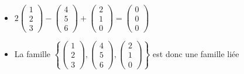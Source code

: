\begin{frame}
\begin{exemple}
\begin{itemize}
\pause
\item $2\left(\begin{smallmatrix}
1\\2\\3
\end{smallmatrix}\right)
-\left(\begin{smallmatrix}
4\\5\\6
\end{smallmatrix}\right) 
+\left(\begin{smallmatrix}
2\\1\\0
\end{smallmatrix}\right) = 
\left(\begin{smallmatrix}
0\\0\\0
\end{smallmatrix}\right)$
\pause
\item La famille 
$\left\{\left(\begin{smallmatrix}
1\\2\\3
\end{smallmatrix}\right),
\left(\begin{smallmatrix}
4\\5\\6
\end{smallmatrix}\right),
\left(\begin{smallmatrix}
2\\1\\0
\end{smallmatrix}\right)\right\}$ est donc une famille liée  
\end{itemize}
\end{exemple}
\end{frame}







